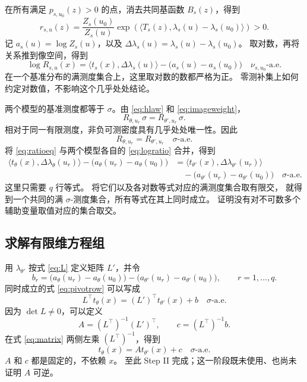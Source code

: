 \documentclass[UTF8,fontset=fandol,11pt,a4paper]{ctexart}
\theoremstyle{definition}
\newcommand{\aev}{\text{-a.e.}}
\newcommand{\ip}[2]{\langle #1,#2\rangle}
\begin{document}
在所有满足 $p_{s,u_0}(z)>0$ 的点，消去共同基函数 $B_s(z)$，得到
\[
 r_{s,u}(z)=\frac{Z_s(u_0)}{Z_s(u)}
 \exp\!\left(\ip{T_s(z)}{\lambda_s(u)-\lambda_s(u_0)}\right)>0.
\]
记 $a_s(u)=\log Z_s(u)$，以及
$\Delta\lambda_s(u)=\lambda_s(u)-\lambda_s(u_0)$。
取对数，再将关系推到像空间，得到
\begin{equation}
 \log R_{s,u}(x)=\ip{t_s(x)}{\Delta\lambda_s(u)}
 -\bigl(a_s(u)-a_s(u_0)\bigr)
 \quad\nu_{s,u_0}\aev \label{eq:logratio}
\end{equation}
在一个基准分布的满测度集合上，这里取对数的数都严格为正。
零测补集上如何约定对数值，不影响这个几乎处处结论。

两个模型的基准测度都等于 $\sigma$。由 \eqref{eq:hlaw} 和
\eqref{eq:imageweight}，
\[
 R_{\theta,u_r}\,\sigma=R_{\theta',u_r}\,\sigma.
\]
相对于同一有限测度，非负可测密度具有几乎处处唯一性。因此
\begin{equation}
 R_{\theta,u_r}=R_{\theta',u_r}\quad\sigma\aev \label{eq:ratioeq}
\end{equation}
将 \eqref{eq:ratioeq} 与两个模型各自的 \eqref{eq:logratio} 合并，得到
\begin{align}
 \ip{t_\theta(x)}{\Delta\lambda_\theta(u_r)}
 -\bigl(a_\theta(u_r)-a_\theta(u_0)\bigr)
 &=\ip{t_{\theta'}(x)}{\Delta\lambda_{\theta'}(u_r)}\nonumber\\[-2pt]
 &\quad-\bigl(a_{\theta'}(u_r)-a_{\theta'}(u_0)\bigr)
 \quad\sigma\aev \label{eq:pivotrow}
\end{align}
这里只需要 $q$ 行等式。
将它们以及各对数等式对应的满测度集合取有限交，
就得到一个共同的满 $\sigma$-测度集合，所有等式在其上同时成立。
证明没有对不可数多个辅助变量取值对应的集合取交。

\subsection{求解有限维方程组}

用 $\lambda_{\theta'}$ 按式 \eqref{eq:L} 定义矩阵 $L'$，并令
\[
 b_r=\bigl(a_\theta(u_r)-a_\theta(u_0)\bigr)
 -\bigl(a_{\theta'}(u_r)-a_{\theta'}(u_0)\bigr),
 \qquad r=1,\ldots,q.
\]
同时成立的式 \eqref{eq:pivotrow} 可以写成
\begin{equation}
 L^\top t_\theta(x)=(L')^\top t_{\theta'}(x)+b
 \quad\sigma\aev \label{eq:matrix}
\end{equation}
因为 $\det L\ne0$，可以定义
\begin{equation}
 A=(L^\top)^{-1}(L')^\top,\qquad
 c=(L^\top)^{-1}b. \label{eq:witness}
\end{equation}
在式 \eqref{eq:matrix} 两侧左乘 $(L^\top)^{-1}$，得到
\begin{equation}
 t_\theta(x)=A t_{\theta'}(x)+c\quad\sigma\aev \label{eq:stepii}
\end{equation}
$A$ 和 $c$ 都是固定的，不依赖 $x$。
至此 Step II 完成；这一阶段既未使用、也尚未证明 $A$ 可逆。
\end{document}
